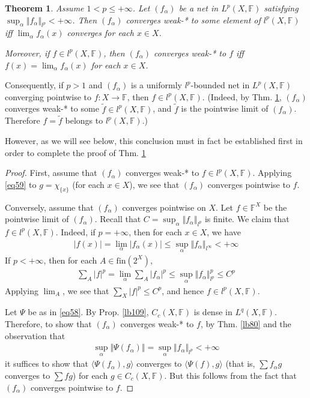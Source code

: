 \documentclass[12pt,b5paper,notitlepage]{article}
\theoremstyle{definition}
\theoremstyle{plain}
\newtheorem{thm}[df]{Theorem}
\newcommand{\wtd}{\widetilde}
\newcommand{\bk}[1]{\langle {#1}\rangle}
\newcommand{\fin}{\mathrm{fin}}
\newcommand{\Fbb}{\mathbb F}
\numberwithin{equation}{section}
\begin{document}
\begin{thm}\label{lb111}
Assume $1<p\leq+\infty$. Let $(f_\alpha)$ be a net in $L^p(X,\Fbb)$ satisfying $\sup_\alpha\Vert f_\alpha\Vert_{l^p}<+\infty$. Then $(f_\alpha)$ converges weak-* to some element of $l^p(X,\Fbb)$ iff $\lim_\alpha f_\alpha(x)$ converges for each $x\in X$. 

Moreover, if $f\in l^p(X,\Fbb)$, then $(f_\alpha)$ converges weak-* to $f$ iff $f(x)=\lim_\alpha f_\alpha(x)$ for each $x\in X$.
\end{thm}

Consequently, if $p>1$ and $(f_\alpha)$ is a uniformly $l^p$-bounded net in $L^p(X,\Fbb)$ converging pointwise to $f:X\rightarrow\Fbb$, then $f\in l^p(X,\Fbb)$. (Indeed, by Thm. \ref{lb111}, $(f_\alpha)$ converges weak-* to some $\wtd f\in l^p(X,\Fbb)$, and $\wtd f$ is the pointwise limit of $(f_\alpha)$. Therefore $f=\wtd f$ belongs to $l^p(X,\Fbb)$.) 

However, as we will see below, this conclusion must in fact be established first in order to complete the proof of  Thm. \ref{lb111}


\begin{proof}
First, assume that $(f_\alpha)$ converges weak-* to $f\in l^p(X,\Fbb)$. Applying \eqref{eq59} to $g=\chi_{\{x\}}$ (for each $x\in X$), we see that $(f_\alpha)$ converges pointwise to $f$.

Conversely, assume that $(f_\alpha)$ converges pointwise on $X$. Let $f\in\Fbb^X$ be the pointwise limit of $(f_\alpha)$. Recall that $C=\sup_\alpha\Vert f_\alpha\Vert_{l^p}$ is finite. We claim that $f\in l^p(X,\Fbb)$. Indeed, if $p=+\infty$, then for each $x\in X$, we have
\begin{align*}
|f(x)|=\lim_\alpha|f_\alpha(x)|\leq\sup_\alpha \Vert f_\alpha\Vert_{l^\infty}<+\infty
\end{align*}
If $p<+\infty$, then for each $A\in\fin(2^X)$, 
\begin{align*}
\sum_A |f|^p=\lim_\alpha\sum_A |f_\alpha|^p\leq\sup_\alpha \Vert f_\alpha\Vert^p_{l^p}\leq C^p 
\end{align*}
Applying $\lim_A$, we see that $\sum_X|f|^p\leq C^p$, and hence $f\in l^p(X,\Fbb)$.

Let $\Psi$ be as in \eqref{eq58}. By Prop. \ref{lb109}, $C_c(X,\Fbb)$ is dense in $L^q(X,\Fbb)$. Therefore, to show that $(f_\alpha)$ converges weak-* to $f$, by Thm. \ref{lb80} and the observation that
\begin{align*}
\sup_\alpha\Vert\Psi(f_\alpha)\Vert=\sup_\alpha\Vert f_\alpha\Vert_{l^p}<+\infty
\end{align*}
it suffices to show that $\bk{\Psi(f_\alpha),g}$ converges to $\bk{\Psi(f),g}$ (that is, $\sum f_\alpha g$ converges to $\sum fg$) for each $g\in C_c(X,\Fbb)$. But this follows from the fact that $(f_\alpha)$ converges pointwise to $f$.
\end{proof}
\end{document}
